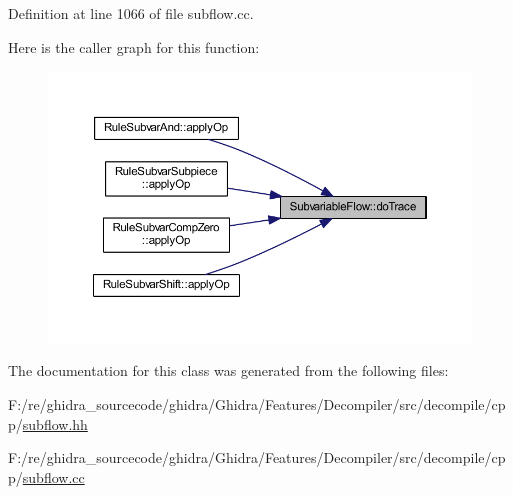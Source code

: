 Definition at line 1066 of file subflow.\+cc.

Here is the caller graph for this function\+:
\nopagebreak
\begin{figure}[H]
\begin{center}
\leavevmode
\includegraphics[width=350pt]{class_subvariable_flow_ad6b6ba93a3249ba31526a01198111496_icgraph}
\end{center}
\end{figure}


The documentation for this class was generated from the following files\+:\begin{DoxyCompactItemize}
\item 
F\+:/re/ghidra\+\_\+sourcecode/ghidra/\+Ghidra/\+Features/\+Decompiler/src/decompile/cpp/\mbox{\hyperlink{subflow_8hh}{subflow.\+hh}}\item 
F\+:/re/ghidra\+\_\+sourcecode/ghidra/\+Ghidra/\+Features/\+Decompiler/src/decompile/cpp/\mbox{\hyperlink{subflow_8cc}{subflow.\+cc}}\end{DoxyCompactItemize}
